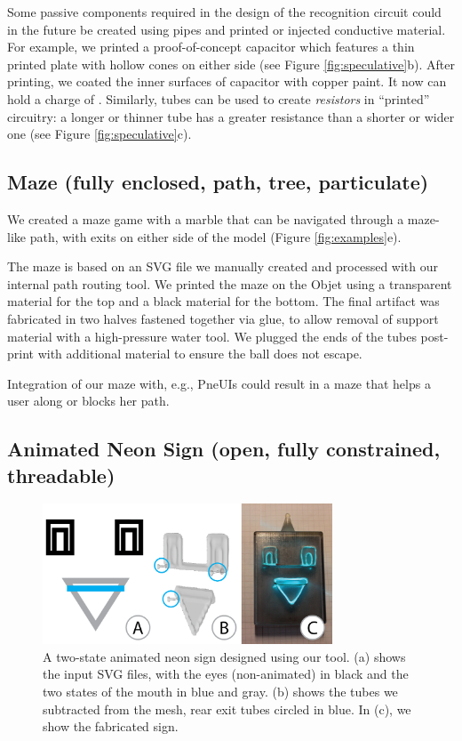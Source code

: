 Some passive components required in the design of the recognition circuit could in the future be created using pipes and printed or injected conductive material.  For example, we printed a proof-of-concept  capacitor which features a thin printed plate with hollow cones on either side (see Figure \ref{fig:speculative}b).  After printing, we coated the inner surfaces of capacitor with copper paint.  It now can hold a charge of .  Similarly, tubes can be used to create \emph{resistors} in ``printed'' circuitry: a longer or thinner tube has a greater resistance than a shorter or wider one (see Figure \ref{fig:speculative}c).

\subsection{Maze (fully enclosed, path, tree, particulate)}

We created a maze game with a marble that can be navigated through a maze-like path, with exits on either side of the model (Figure \ref{fig:examples}e). 

The maze is based on an SVG file we manually created and processed with our internal path routing tool.  We printed the maze on the Objet using a transparent material for the top and a black material for the bottom. The final artifact was fabricated in two halves fastened together via glue, to allow removal of support material with a high-pressure water tool.  We plugged the ends of the tubes post-print with additional material to ensure the ball does not escape.

Integration of our maze with, e.g., PneUIs \cite{Yao-pneui} could result in a maze that helps a user along or blocks her path.

\subsection{Animated Neon Sign (open, fully constrained, threadable)}

\begin{figure}[t]
\centering
    \includegraphics[width=3.4in]{figures/sign.png}
\caption{A two-state animated neon sign designed using our tool.  (a) shows the input SVG files, with the eyes (non-animated) in black and the two states of the mouth in {\color{blue}blue} and {\color{gray}gray}.  (b) shows the tubes we subtracted from the mesh, rear exit tubes circled in {\color{blue}blue}. In (c), we show the fabricated sign.}
\label{fig:neon}
\end{figure}

